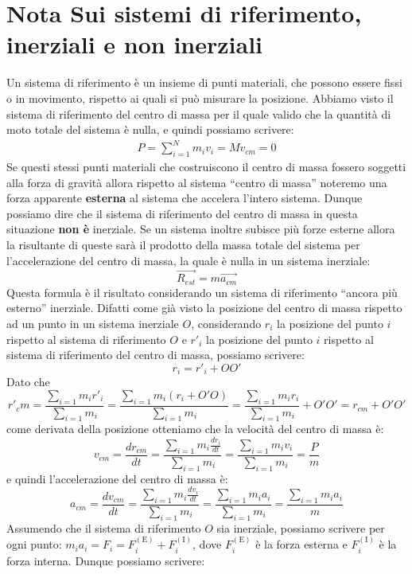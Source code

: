 \section{Nota Sui sistemi di riferimento, inerziali e non inerziali}
    Un sistema di riferimento è un insieme di punti materiali, che possono essere fissi o in movimento, rispetto ai quali si può misurare la posizione. Abbiamo visto il sistema di riferimento del centro di massa per il quale valido che la quantità di moto totale del sistema è nulla, e quindi possiamo scrivere:
    \begin{align*}
        P = \sum_{i=1}^{N} m_i v_i = M v_{cm} = 0
    \end{align*}
    Se questi stessi punti materiali che costruiscono il centro di massa fossero soggetti alla forza di gravità allora rispetto al sistema ``centro di massa'' noteremo una forza apparente \textbf{esterna} al sistema che accelera l'intero sistema. Dunque possiamo dire che il sistema di riferimento del centro di massa in questa situazione \textbf{non è} inerziale. Se un sistema inoltre subisce più forze esterne allora la risultante di queste sarà il prodotto della massa totale del sistema per l'accelerazione del centro di massa, la quale è nulla in un sistema inerziale:
    $$ \vec{R_{est}}=m\vec{a_{cm}}$$ 
    Questa formula è il risultato considerando un sistema di riferimento ``ancora più esterno'' inerziale. Difatti come già visto la posizione del centro di massa rispetto ad un punto in un sistema inerziale $O$, considerando $r_i$ la posizione del punto $i$ rispetto al sistema di riferimento $O$ e $r'_i$ la posizione del punto $i$ rispetto al sistema di riferimento del centro di massa, possiamo scrivere:
    $$
        r_i = r'_i + OO'
    $$
    Dato che $$
        r'_cm = \frac{\sum_{i=1}m_i r'_i}{\sum_{i=1}m_i} = \frac{\sum_{i=1}m_i (r_i + O'O)}{\sum_{i=1}m_i} = \frac{\sum_{i=1}m_i r_i}{\sum_{i=1}m_i} + O'O' = r_{cm} + O'O'
    $$
    come derivata della posizione otteniamo che la velocità del centro di massa è:
    $$
        v_{cm} = \frac{dr_{cm}}{dt} = \frac{\sum_{i=1}m_i \frac{dr_i}{dt}}{\sum_{i=1}m_i} = \frac{\sum_{i=1}m_i v_i}{\sum_{i=1}m_i} = \frac{P}{m}
    $$
    e quindi l'accelerazione del centro di massa è:
    $$
        a_{cm} = \frac{dv_{cm}}{dt} = \frac{\sum_{i=1}m_i \frac{dv_i}{dt}}{\sum_{i=1}m_i} = \frac{\sum_{i=1}m_i a_i}{\sum_{i=1}m_i} = \frac{\sum_{i=1}m_i a_i}{m}
    $$
    Assumendo che il sistema di riferimento $O$ sia inerziale, possiamo scrivere per ogni punto: $m_ia_i = F_i = F_i^{(\text{E})} + F_i^{(\text{I})}$, dove $F_i^{(\text{E})}$ è la forza esterna e $F_i^{(\text{I})}$ è la forza interna. Dunque possiamo scrivere:
